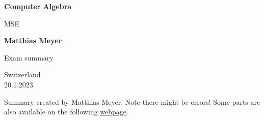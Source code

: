 \documentclass[12pt]{article}
\begin{document}
\begin{titlepage}
    \begin{center}
        \vspace*{1cm}
            
        \Huge
        \textbf{Computer Algebra}
            
        \vspace{0.5cm}
        \LARGE
        MSE
            
        \vspace{1.5cm}
            
        \textbf{Matthias Meyer}
            
        \vfill
            
        Exam summary\\
            
        \vspace{0.8cm}
            
            
        \Large
        Switzerland\\
        20.1.2023
            
    \end{center}
\end{titlepage}
Summary created by Matthias Meyer. Note there might be errors!
\tableofcontents 
Some parts are also available on the following \href{https://mmeyer.tech/category/knowledge/math/}{webpage}.














































\end{document}
